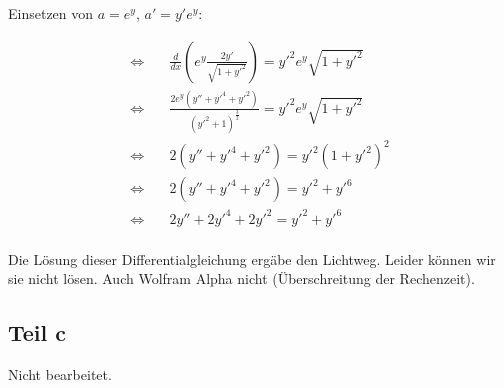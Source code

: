\documentclass[a4paper,german,12pt,smallheadings]{scrartcl}
\begin{document}
Einsetzen von $a = e^y$, $a' = y' e^y$:

\begin{align*}
  \Leftrightarrow \quad &\frac{d}{dx} \left(e^y \frac{2y'}{\sqrt{1+y'^2}} \right) = y'^2 e^y \sqrt{1+y'^2} \\
  \Leftrightarrow \quad &\frac{2e^y(y''+y'^4+y'^2)}{(y'^2+1)^\frac{3}{2}}= y'^2 e^y \sqrt{1+y'^2} \\
  \Leftrightarrow \quad &2(y''+y'^4+y'^2)= y'^2 (1+y'^2)^2\\
  \Leftrightarrow \quad &2(y''+y'^4+y'^2)= y'^2+y'^6\\
  \Leftrightarrow \quad &2y''+2y'^4+2y'^2= y'^2+y'^6\\
\end{align*}

Die Lösung dieser Differentialgleichung ergäbe den Lichtweg. Leider können wir
sie nicht lösen. Auch Wolfram Alpha nicht (Überschreitung der Rechenzeit).

\subsection*{Teil c}
Nicht bearbeitet.
\end{document}
